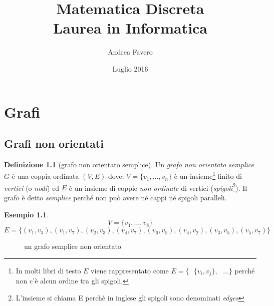 \documentclass[a4paper, oneside, openany]{book}
\theoremstyle{plain}
\theoremstyle{definition}
\newtheorem{defn}{Definizione}[chapter]
\newtheorem{ese}{Esempio}[section]
\begin{document}
\title{Matematica Discreta\\Laurea in Informatica}
\author{Andrea Favero}
\date{Luglio 2016}
\maketitle


\tableofcontents    %


\chapter{Grafi}

\section{Grafi non orientati}

\begin{defn}[grafo non orientato semplice]	
Un \emph{grafo non orientato semplice} $G$ è una coppia ordinata $(V,E)$ dove: $V=\{v_1,\dots,v_n\}$ è
un insieme\footnote{ In molti libri di testo $E$ viene rappresentato come
${E = \{ \text{ } \{v_i,v_j\}, \text{ } \dots \}}$ 
perché non c'è alcun ordine tra gli spigoli.} finito di \emph{vertici} (o \emph{nodi}) ed $E$ è 
un insieme di coppie \emph{non ordinate} di vertici 
(\emph{spigoli}\footnote{L'insieme si chiama E perchè in inglese gli spigoli 
sono denominati \emph{edges}}).%
Il grafo è detto \emph{semplice} perché non può avere né cappi né spigoli paralleli.
\end{defn}

\begin{ese}
\[V = \{ v_1, \dots, v_8 \}\]
\[E = \{ (v_1,v_3), (v_1,v_7), (v_2,v_3), (v_4,v_7),(v_6,v_5), (v_4,v_2), (v_3,v_5), (v_5,v_7) \}\]
\end{ese}

\begin{figure}[!ht]
    \centering
    \caption{un grafo semplice non orientato}
\end{figure}
\end{document}
